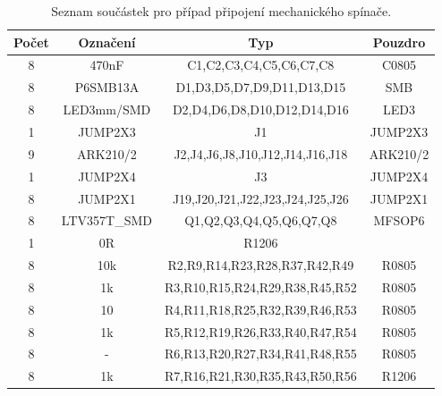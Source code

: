 \documentclass[12pt,a4paper,oneside]{article}
\begin{document}
\begin{savenotes}
\begin{table}[h!]
\begin{center}
\begin{tabular}{ |c|c|c|c| }
\hline 
Počet & Označení & Typ  & Pouzdro  \\ 
\hline 
8	&	470nF	&	C1,C2,C3,C4,C5,C6,C7,C8	&	C0805	\\
8	&	P6SMB13A	&	D1,D3,D5,D7,D9,D11,D13,D15	&	SMB	\\
8	&	LED3mm/SMD	&	D2,D4,D6,D8,D10,D12,D14,D16	&	LED3	\\
1	&	JUMP2X3	&	J1	&	JUMP2X3	\\
9	&	ARK210/2	&	J2,J4,J6,J8,J10,J12,J14,J16,J18	&	ARK210/2	\\
1	&	JUMP2X4	&	J3	&	JUMP2X4	\\
8	&	JUMP2X1	&	J19,J20,J21,J22,J23,J24,J25,J26	&	JUMP2X1	\\
8	&	LTV357T\_SMD	&	Q1,Q2,Q3,Q4,Q5,Q6,Q7,Q8	&	MFSOP6	\\
1	&	0R	&	R1206	&		\\
8	&	10k	&	R2,R9,R14,R23,R28,R37,R42,R49	&	R0805	\\
8	&	1k	&	R3,R10,R15,R24,R29,R38,R45,R52	&	R0805	\\
8	&	10	&	R4,R11,R18,R25,R32,R39,R46,R53	&	R0805	\\
8	&	1k	&	R5,R12,R19,R26,R33,R40,R47,R54	&	R0805	\\
8	&	-	&	R6,R13,R20,R27,R34,R41,R48,R55	&	R0805	\\
8	&	1k	&	R7,R16,R21,R30,R35,R43,R50,R56	&	R1206	\\
\hline 
\end{tabular}
\end{center}
\caption{Seznam součástek pro případ připojení mechanického spínače.}
\label{seznam_soucastek_switch}
\end{table}
\end{savenotes}



\begin{thebibliography}{99}

\end{thebibliography}
\end{document}
